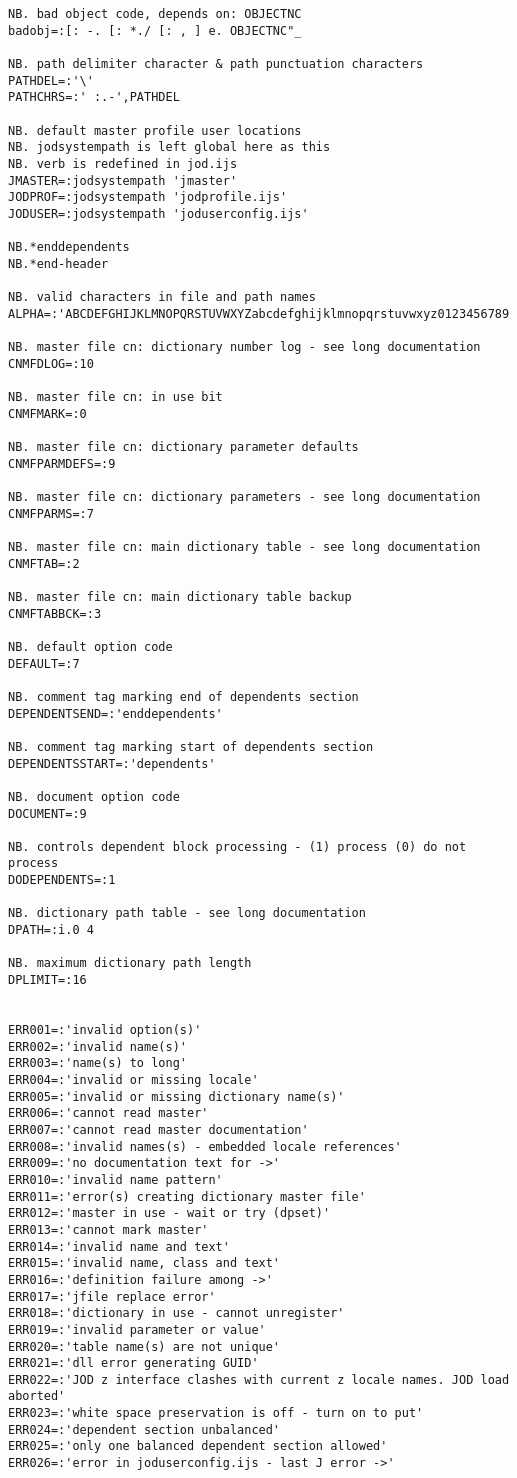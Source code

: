 \begin{lstlisting}[frame=single,framerule=0pt,basicstyle=\ttfamily\tiny]
NB. bad object code, depends on: OBJECTNC
badobj=:[: -. [: *./ [: , ] e. OBJECTNC"_

NB. path delimiter character & path punctuation characters
PATHDEL=:'\'
PATHCHRS=:' :.-',PATHDEL

NB. default master profile user locations
NB. jodsystempath is left global here as this
NB. verb is redefined in jod.ijs
JMASTER=:jodsystempath 'jmaster'
JODPROF=:jodsystempath 'jodprofile.ijs'
JODUSER=:jodsystempath 'joduserconfig.ijs'

NB.*enddependents
NB.*end-header

NB. valid characters in file and path names
ALPHA=:'ABCDEFGHIJKLMNOPQRSTUVWXYZabcdefghijklmnopqrstuvwxyz0123456789'

NB. master file cn: dictionary number log - see long documentation
CNMFDLOG=:10

NB. master file cn: in use bit
CNMFMARK=:0

NB. master file cn: dictionary parameter defaults
CNMFPARMDEFS=:9

NB. master file cn: dictionary parameters - see long documentation
CNMFPARMS=:7

NB. master file cn: main dictionary table - see long documentation
CNMFTAB=:2

NB. master file cn: main dictionary table backup
CNMFTABBCK=:3

NB. default option code
DEFAULT=:7

NB. comment tag marking end of dependents section
DEPENDENTSEND=:'enddependents'

NB. comment tag marking start of dependents section
DEPENDENTSSTART=:'dependents'

NB. document option code
DOCUMENT=:9

NB. controls dependent block processing - (1) process (0) do not process
DODEPENDENTS=:1

NB. dictionary path table - see long documentation
DPATH=:i.0 4

NB. maximum dictionary path length
DPLIMIT=:16


ERR001=:'invalid option(s)'
ERR002=:'invalid name(s)'
ERR003=:'name(s) to long'
ERR004=:'invalid or missing locale'
ERR005=:'invalid or missing dictionary name(s)'
ERR006=:'cannot read master'
ERR007=:'cannot read master documentation'
ERR008=:'invalid names(s) - embedded locale references'
ERR009=:'no documentation text for ->'
ERR010=:'invalid name pattern'
ERR011=:'error(s) creating dictionary master file'
ERR012=:'master in use - wait or try (dpset)'
ERR013=:'cannot mark master'
ERR014=:'invalid name and text'
ERR015=:'invalid name, class and text'
ERR016=:'definition failure among ->'
ERR017=:'jfile replace error'
ERR018=:'dictionary in use - cannot unregister'
ERR019=:'invalid parameter or value'
ERR020=:'table name(s) are not unique'
ERR021=:'dll error generating GUID'
ERR022=:'JOD z interface clashes with current z locale names. JOD load aborted'
ERR023=:'white space preservation is off - turn on to put'
ERR024=:'dependent section unbalanced'
ERR025=:'only one balanced dependent section allowed'
ERR026=:'error in joduserconfig.ijs - last J error ->'


\end{lstlisting}
